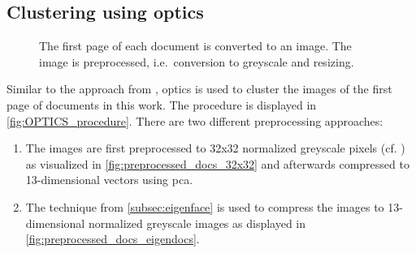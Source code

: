 \subsection{Clustering using \acs*{optics}}\label{subsec:impl-optics}

\begin{figure}[!htb] %
    \centering
    
    \caption[\ac{optics} procedure]{The first page of each document is converted to an image.
    The image is preprocessed, i.e.\ conversion to greyscale and resizing.
    }
    \label{fig:OPTICS_procedure}
\end{figure}

Similar to the approach from \citeauthor{OPTICS1999}, \ac{optics} is used to cluster the images of the first page of documents in this work.
The procedure is displayed in \autoref{fig:OPTICS_procedure}.
There are two different preprocessing approaches:
\begin{enumerate}
    \item \label{pt:32}The images are first preprocessed to 32x32 normalized greyscale pixels (cf. \cite{OPTICS1999}) 
    as visualized in \autoref{fig:preprocessed_docs_32x32}
    and afterwards compressed to 13-dimensional vectors using \ac{pca}.
    \item \label{pt:eigendocs}The technique \eigendocs{} from \autoref{subsec:eigenface} 
    is used to compress the images to 13-dimensional normalized greyscale images as displayed in \autoref{fig:preprocessed_docs_eigendocs}.
\end{enumerate}


